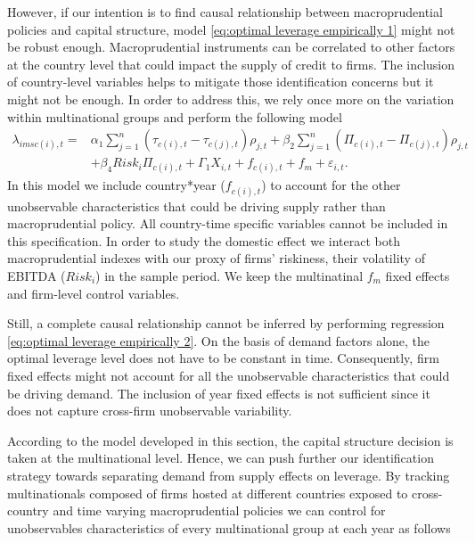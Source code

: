 \documentclass[12pt]{article}
\begin{document}
	However, if our intention is to find causal relationship between macroprudential policies and capital structure, model \ref{eq:optimal leverage empirically 1} might not be robust enough.
	 Macroprudential instruments can be correlated to other factors at the country level that could impact the supply of credit to firms. The inclusion of country-level variables helps to mitigate those identification concerns but it might not be enough. In order to address this, we rely once more on the variation within multinational groups and perform the following model
	\begin{equation}
	\begin{aligned}
	\lambda_{imsc(i),t}=&\alpha_1\sum_{j=1}^{n}(\tau_{c(i),t}-\tau_{c(j),t})\rho_{j,t}+\beta_2\sum_{j=1}^{n}(\Pi_{c(i),t}-\Pi_{c(j),t})\rho_{j,t}\\
	&+\beta_4Risk_{i}\Pi_{c(i),t}+\Gamma_1 X_{i,t}+f_{c(i),t}+f_{m}+\varepsilon_{i,t}.
	\label{eq:optimal leverage empirically 2}
	\end{aligned}
	\end{equation}
	In this model we include country*year ($f_{c(i),t}$) to account for the other unobservable characteristics that could be driving supply rather than macroprudential policy. All country-time specific variables cannot be included in this specification. In order to study the domestic effect we interact both macroprudential indexes with our proxy of firms' riskiness, their volatility of EBITDA ($Risk_{i}$) in the sample period. We keep the multinatinal $f_{m}$ fixed effects and firm-level control variables.  
	
	Still, a complete causal relationship cannot be inferred by performing regression \ref{eq:optimal leverage empirically 2}. On the basis of demand factors alone, the optimal leverage level does not have to be constant in time. Consequently, firm fixed effects might not account for all the unobservable characteristics that could be driving demand. The inclusion of year fixed effects is not sufficient since it does not capture cross-firm unobservable variability.  
	
	According to the model developed in this section, the capital structure decision is taken at the multinational level. Hence, we can push further our identification strategy towards separating demand from supply effects on leverage. By tracking multinationals composed of firms hosted at different countries exposed to cross-country and time varying macroprudential policies we can control for unobservables characteristics of every multinational group at each year as follows   
	
\end{document}
